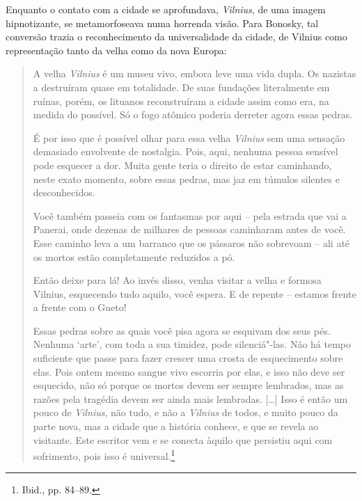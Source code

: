 Enquanto o contato com a cidade se aprofundava, \textit{Vilnius}, de uma imagem
hipnotizante, se metamorfoseava numa horrenda visão. Para Bonosky, tal
conversão trazia o reconhecimento da universalidade da cidade, de
Vilnius como representação tanto da velha como da nova Europa:

\begin{quote}
A velha \textit{Vilnius} é um museu vivo, embora leve uma vida dupla. Os nazistas
a destruíram quase em totalidade. De suas fundações literalmente em
ruínas, porém, os lituanos reconstruíram a cidade assim como era, na
medida do possível. Só o fogo atômico poderia derreter agora essas
pedras.

É por isso que é possível olhar para essa velha \textit{Vilnius} sem uma sensação
demasiado envolvente de nostalgia. Pois, aqui, nenhuma pessoa sensível
pode esquecer a dor. Muita gente teria o direito de estar caminhando,
neste exato momento, sobre essas pedras, mas jaz em túmulos silentes e
desconhecidos.

Você também passeia com os fantasmas por aqui -- pela estrada que vai a
Panerai, onde dezenas de milhares de pessoas caminharam antes de você.
Esse caminho leva a um barranco que os pássaros não sobrevoam -- ali até
os mortos estão completamente reduzidos a pó.

Então deixe para lá! Ao invés disso, venha visitar a velha e formosa
Vilnius, esquecendo tudo aquilo, você espera. E de repente -- estamos
frente a frente com o Gueto!

Essas pedras sobre as quais você pisa agora se esquivam dos seus pés.
Nenhuma `arte', com toda a sua timidez, pode silenciá"-las. Não há tempo
suficiente que passe para fazer crescer uma crosta de esquecimento sobre
elas. Pois ontem mesmo sangue vivo escorria por elas, e isso não deve
ser esquecido, não só porque os mortos devem ser sempre lembrados, mas
as razões pela tragédia devem ser ainda mais lembradas. [\ldots{}] Isso é
então um pouco de \textit{Vilnius}, não tudo, e não a \textit{Vilnius} de todos, e muito
pouco da parte nova, mas a cidade que a história conhece, e que se
revela ao visitante. Este escritor vem e se conecta àquilo que persistiu
aqui com sofrimento, pois isso é universal.\footnote{Ibid., pp. 84--89.}
\end{quote}

